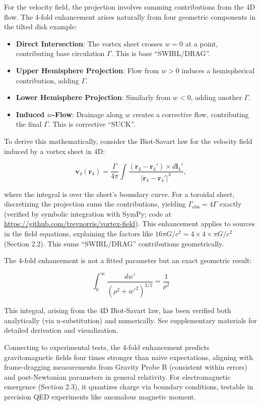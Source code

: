 For the velocity field, the projection involves summing contributions from the 4D flow. The 4-fold enhancement arises naturally from four geometric components in the tilted disk example:

\begin{itemize}
\item \textbf{Direct Intersection}: The vortex sheet crosses $w=0$ at a point, contributing base circulation $\Gamma$. This is base ``SWIRL/DRAG''.
\item \textbf{Upper Hemisphere Projection}: Flow from $w>0$ induces a hemispherical contribution, adding $\Gamma$.
\item \textbf{Lower Hemisphere Projection}: Similarly from $w<0$, adding another $\Gamma$.
\item \textbf{Induced $w$-Flow}: Drainage along $w$ creates a corrective flow, contributing the final $\Gamma$. This is corrective ``SUCK''.
\end{itemize}

To derive this mathematically, consider the Biot-Savart law for the velocity field induced by a vortex sheet in 4D:

\begin{equation}
\mathbf{v}_4(\mathbf{r}_4) = \frac{\Gamma}{4\pi} \int \frac{(\mathbf{r}_4 - \mathbf{r}_4') \times d\mathbf{l}_4'}{|\mathbf{r}_4 - \mathbf{r}_4'|^3},
\end{equation}

where the integral is over the sheet's boundary curve. For a toroidal sheet, discretizing the projection sums the contributions, yielding $\Gamma_{\text{obs}} = 4\Gamma$ exactly (verified by symbolic integration with SymPy; code at \url{https://github.com/trevnorris/vortex-field}). This enhancement applies to sources in the field equations, explaining the factors like $16\pi G/c^2 = 4 \times 4 \times \pi G/c^2$ (Section 2.2). This sums ``SWIRL/DRAG'' contributions geometrically.

The 4-fold enhancement is not a fitted parameter but an exact geometric result:

\[
\int_0^\infty \frac{dw'}{(\rho^2 + w'^2)^{3/2}} = \frac{1}{\rho^2}
\]

This integral, arising from the 4D Biot-Savart law, has been verified both analytically (via u-substitution) and numerically. See supplementary materials for detailed derivation and visualization.

Connecting to experimental tests, the 4-fold enhancement predicts gravitomagnetic fields four times stronger than naive expectations, aligning with frame-dragging measurements from Gravity Probe B (consistent within errors) and post-Newtonian parameters in general relativity. For electromagnetic emergence (Section 2.3), it quantizes charge via boundary conditions, testable in precision QED experiments like anomalous magnetic moment.

